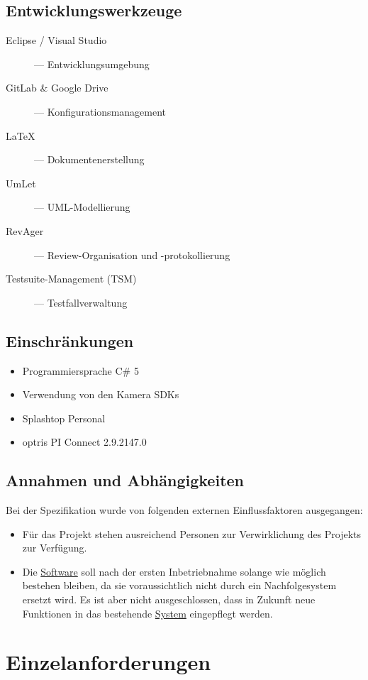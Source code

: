 \subsection{Entwicklungswerkzeuge}
\begin{description}
	\item [Eclipse / Visual Studio] --- Entwicklungsumgebung
	\item [GitLab \& Google Drive] --- Konfigurationsmanagement
	\item [\LaTeX{}] --- Dokumentenerstellung
	\item [UmLet] --- UML-Modellierung
	\item [RevAger] --- Review-Organisation und -protokollierung
	\item [Testsuite-Management (TSM)] --- Testfallverwaltung
\end{description}

\subsection{Einschränkungen}
\begin{itemize}
	\item Programmiersprache C\# 5
	\item Verwendung von den Kamera SDKs
	\item Splashtop Personal
	\item optris PI Connect 2.9.2147.0
\end{itemize}

\subsection{Annahmen und Abhängigkeiten}
Bei der Spezifikation wurde von folgenden externen Einflussfaktoren ausgegangen:
\begin{itemize}
	\item Für das Projekt stehen ausreichend Personen zur Verwirklichung des Projekts zur Verfügung.
	\item Die \hyperlink{tab:anwendung}{Software} soll nach der ersten Inbetriebnahme solange wie möglich bestehen bleiben, da sie voraussichtlich nicht durch ein Nachfolgesystem ersetzt wird.
	Es ist aber nicht ausgeschlossen, dass in Zukunft neue Funktionen in das bestehende \hyperlink{tab:system}{System} eingepflegt werden.
\end{itemize}

\section{Einzelanforderungen}
\label{chap:spezi_req}

